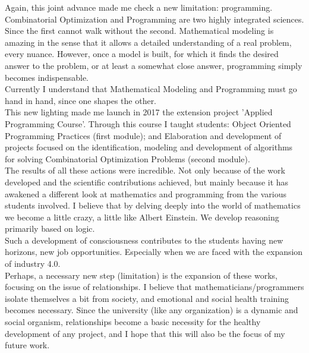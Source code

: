 \documentclass{book}
\begin{document}
Again, this joint advance made me check a new limitation: programming. Combinatorial Optimization and Programming are two highly integrated sciences. Since the first cannot walk without the second. Mathematical modeling is amazing in the sense that it allows a detailed understanding of a real problem, every nuance. However, once a model is built, for which it finds the desired answer to the problem, or at least a somewhat close answer, programming simply becomes indispensable. \\

Currently I understand that Mathematical Modeling and Programming must go hand in hand, since one shapes the other. \\

This new lighting made me launch in 2017 the extension project 'Applied Programming Course'. Through this course I taught students: Object Oriented Programming Practices (first module); and Elaboration and development of projects focused on the identification, modeling and development of algorithms for solving Combinatorial Optimization Problems (second module). \\

The results of all these actions were incredible. Not only because of the work developed and the scientific contributions achieved, but mainly because it has awakened a different look at mathematics and programming from the various students involved. I believe that by delving deeply into the world of mathematics we become a little crazy, a little like Albert Einstein. We develop reasoning primarily based on logic. \\

Such a development of consciousness contributes to the students having new horizons, new job opportunities. Especially when we are faced with the expansion of industry 4.0. \\

Perhaps, a necessary new step (limitation) is the expansion of these works, focusing on the issue of relationships. I believe that mathematicians/programmers isolate themselves a bit from society, and emotional and social health training becomes necessary. Since the university (like any organization) is a dynamic and social organism, relationships become a basic necessity for the healthy development of any project, and I hope that this will also be the focus of my future work. \\
\end{document}
